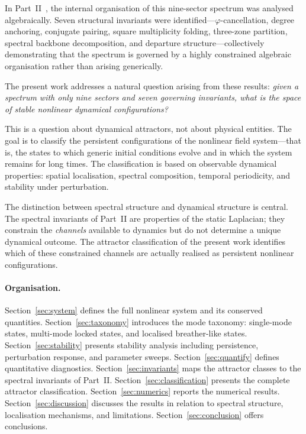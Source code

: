 \documentclass[12pt,a4paper]{article}
\newcommand{\vphi}{\varphi}
\begin{document}
In Part~II~\cite{paper2}, the internal organisation of this nine-sector
spectrum was analysed algebraically.  Seven structural invariants were
identified---$\vphi$-cancellation, degree anchoring, conjugate pairing,
square multiplicity folding, three-zone partition, spectral backbone
decomposition, and departure structure---collectively demonstrating
that the spectrum is governed by a highly constrained algebraic
organisation rather than arising generically.

The present work addresses a natural question arising from these
results: \emph{given a spectrum with only nine sectors and seven
governing invariants, what is the space of stable nonlinear dynamical
configurations?}

This is a question about dynamical attractors, not about physical
entities.  The goal is to classify the persistent configurations of the
nonlinear field system---that is, the states to which generic initial
conditions evolve and in which the system remains for long times.  The
classification is based on observable dynamical properties: spatial
localisation, spectral composition, temporal periodicity, and stability
under perturbation.

The distinction between spectral structure and dynamical structure is
central.  The spectral invariants of Part~II are properties of the
static Laplacian; they constrain the \emph{channels} available to
dynamics but do not determine a unique dynamical outcome.  The
attractor classification of the present work identifies which of these
constrained channels are actually realised as persistent nonlinear
configurations.

\paragraph{Organisation.}
Section~\ref{sec:system} defines the full nonlinear system and its
conserved quantities.  Section~\ref{sec:taxonomy} introduces the mode
taxonomy: single-mode states, multi-mode locked states, and localised
breather-like states.  Section~\ref{sec:stability} presents stability
analysis including persistence, perturbation response, and parameter
sweeps.  Section~\ref{sec:quantify} defines quantitative diagnostics.
Section~\ref{sec:invariants} maps the attractor classes to the
spectral invariants of Part~II.  Section~\ref{sec:classification}
presents the complete attractor classification.
Section~\ref{sec:numerics} reports the numerical results.
Section~\ref{sec:discussion} discusses the results in relation to
spectral structure, localisation mechanisms, and limitations.
Section~\ref{sec:conclusion} offers conclusions.
\end{document}
